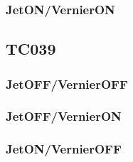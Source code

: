 \documentclass[12pt]{article}
\begin{document}
\subsubsection{JetON/VernierON}

\subsection{\textbf{TC039}}\label{sec:TC039}

\subsubsection{JetOFF/VernierOFF}

\subsubsection{JetOFF/VernierON}

\subsubsection{JetON/VernierOFF}
\end{document}

